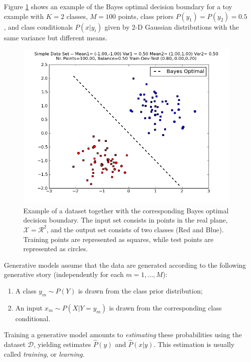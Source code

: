 Figure \ref{simpleDataSet_bo} shows an example of
the Bayes optimal decision boundary for a toy example with $K=2$ classes, $M=100$ points, class priors $P(y_1) = P(y_2) = 0.5$, and class conditionals $P(x|y_i)$ given by 2-D Gaussian distributions with the same variance but different means.

\begin{figure}[h]
\begin{center}
    \includegraphics[width=1\columnwidth]{figs/classification/gaussian_separabale_bo.png}
  \caption{\label{simpleDataSet_bo} Example of a dataset together with
    the corresponding Bayes optimal decision boundary.
    The input set consists in points in the real plane, $\mathcal{X} =
    \mathcal{R^2}$, and the output set consists of two classes (Red
    and Blue). Training points are represented as squares, while test
    points are represented as circles.}
  \end{center}
\end{figure}



Generative models assume that the data are generated according to the following generative story (independently for each $m=1,\ldots,M$): 
\begin{enumerate}
\item A class $y_m \sim P(Y)$ is drawn from the class prior distribution;
\item An input $x_m \sim P(X|Y=y_m)$ is drawn from the corresponding class conditional.
\end{enumerate}
Training a generative model 
amounts to \emph{estimating} these probabilities using the dataset $\mathcal{D}$, yielding estimates 
$\hat{P}(y)$ and $\hat{P}(x|y)$. This estimation is usually called \emph{training}, or \emph{learning}.

